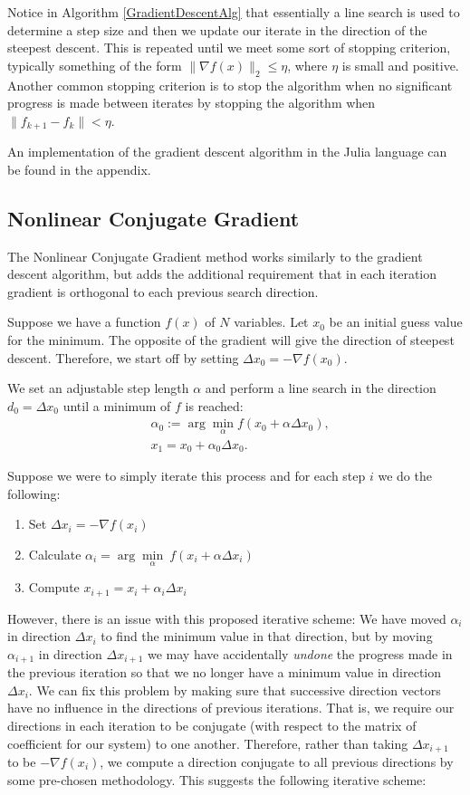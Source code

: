 Notice in Algorithm \ref{GradientDescentAlg} that essentially a line search is used to determine a step size and then we update our iterate in the direction of the steepest descent. This is repeated until we meet some sort of stopping criterion, typically something of the form $\|\nabla f(x)\|_2\leq\eta$, where $\eta$ is small and positive. Another common stopping criterion is to stop the algorithm when no significant progress is made between iterates by stopping the algorithm when $\|f_{k+1}-f_{k}\|<\eta$.

An implementation of the gradient descent algorithm in the Julia language can be found in the appendix.

\subsection{Nonlinear Conjugate Gradient}

The Nonlinear Conjugate Gradient method works similarly to the gradient descent algorithm, but adds the additional requirement that in each iteration gradient is orthogonal to each previous search direction.

Suppose we have a function $f(x)$ of $N$ variables. Let $x_0$ be an initial guess value for the minimum. The opposite of the gradient will give the direction of steepest descent. Therefore, we start off by setting $\Delta x_0=-\nabla f(x_0)$.

We set an adjustable step length $\alpha$ and perform a line search in the direction $d_0=\Delta x_0$ until a minimum of $f$ is reached:
\begin{align*}
	& \alpha_0:=\arg\min_{\alpha} f(x_0+\alpha\Delta x_0), \\
	& x_1=x_0+\alpha_0\Delta x_0.                          
\end{align*}

Suppose we were to simply iterate this process and for each step $i$ we do the following:

\begin{enumerate}
	\item Set $\Delta x_i=-\nabla f(x_i)$
	\item Calculate $\alpha_i=\arg\underset{\alpha}{\min}\ f(x_i+\alpha\Delta x_i)$
	\item Compute $x_{i+1}=x_i+\alpha_i\Delta x_i$
\end{enumerate}

However, there is an issue with this proposed iterative scheme: We have moved $\alpha_i$ in direction $\Delta x_i$ to find the minimum value in that direction, but by moving $\alpha_{i+1}$ in direction $\Delta x_{i+1}$ we may have accidentally \textit{undone} the progress made in the previous iteration so that we no longer have a minimum value in direction $\Delta x_i$. We can fix this problem by making sure that successive direction vectors have no influence in the directions of previous iterations. That is, we require our directions in each iteration to be conjugate (with respect to the matrix of coefficient for our system) to one another. Therefore, rather than taking $\Delta x_{i+1}$ to be $-\nabla f(x_i)$, we compute a direction conjugate to all previous directions by some pre-chosen methodology. This suggests the following iterative scheme:

